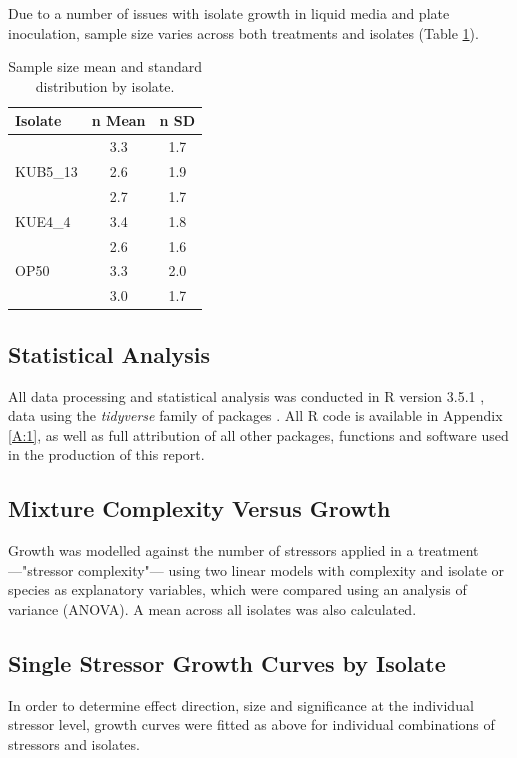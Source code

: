 \documentclass[final,1p,times]{elsarticle}
\begin{document}
Due to a number of issues with isolate growth in liquid media and plate inoculation, sample size varies across both treatments and isolates (Table \ref{tab:samples}). 

\begin{table}[ht]
\centering
\small
\begin{tabular}{l c c}
\toprule 
\textbf{Isolate} & \textbf{n Mean} & \textbf{n SD}  \\
\midrule
\rowcolor{black!20}{LUF4\_5} & 3.3 & 1.7 \\
{KUB5\_13} & 2.6 & 1.9 \\
\rowcolor{black!20}{NUF1\_3} & 2.7 & 1.7\\
{KUE4\_4} & 3.4 & 1.8\\
\rowcolor{black!20}{NUE1\_1} & 2.6 & 1.6\\
{OP50} & 3.3 & 2.0 \\
\rowcolor{black!20}{Soil Community} & 3.0 & 1.7\\
\bottomrule
\end{tabular}
\caption{Sample size mean and standard distribution by isolate.}
\label{tab:samples}
\end{table}

\subsection{Statistical Analysis}
\label{S:2:6}
All data processing and statistical analysis was conducted in R version 3.5.1 \cite{RCoreTeam2018R:Computing}, data using the \textit{tidyverse} family of packages \cite{Wickham2017Tidyverse:Tidyverse}. All R code is available in Appendix \ref{A:1}, as well as full attribution of all other packages, functions and software used in the production of this report.

\subsection{Mixture Complexity Versus Growth}
\label{S:2:7}
Growth was modelled against the number of stressors applied in a treatment ---"stressor complexity"--- using two linear models with complexity and isolate or species as explanatory variables, which were compared using an analysis of variance (ANOVA). A mean across all isolates was also calculated. 

\subsection{Single Stressor Growth Curves by Isolate}
\label{S:2:8}
In order to determine effect direction, size and significance at the individual stressor level, growth curves were fitted as above for individual combinations of stressors and isolates. 
\end{document}

